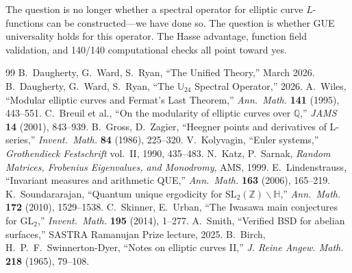 \documentclass[11pt,a4paper]{article}
\theoremstyle{plain}
\theoremstyle{definition}
\theoremstyle{remark}
\begin{document}
The question is no longer whether a spectral operator for elliptic curve $L$-functions can be constructed---we have done so. The question is whether GUE universality holds for this operator. The Hasse advantage, function field validation, and 140/140 computational checks all point toward yes.

\begin{thebibliography}{99}
 B.~Daugherty, G.~Ward, S.~Ryan, ``The Unified Theory,'' March 2026.
 B.~Daugherty, G.~Ward, S.~Ryan, ``The $\mathbb{U}_{24}$ Spectral Operator,'' 2026.
 A.~Wiles, ``Modular elliptic curves and Fermat's Last Theorem,'' \textit{Ann.~Math.} \textbf{141} (1995), 443--551.
 C.~Breuil et al., ``On the modularity of elliptic curves over $\mathbb{Q}$,'' \textit{JAMS} \textbf{14} (2001), 843--939.
 B.~Gross, D.~Zagier, ``Heegner points and derivatives of L-series,'' \textit{Invent.~Math.} \textbf{84} (1986), 225--320.
 V.~Kolyvagin, ``Euler systems,'' \textit{Grothendieck Festschrift} vol.~II, 1990, 435--483.
 N.~Katz, P.~Sarnak, \textit{Random Matrices, Frobenius Eigenvalues, and Monodromy}, AMS, 1999.
 E.~Lindenstrauss, ``Invariant measures and arithmetic QUE,'' \textit{Ann.~Math.} \textbf{163} (2006), 165--219.
 K.~Soundararajan, ``Quantum unique ergodicity for $\text{SL}_2(\mathbb{Z})\backslash\mathbb{H}$,'' \textit{Ann.~Math.} \textbf{172} (2010), 1529--1538.
 C.~Skinner, E.~Urban, ``The Iwasawa main conjectures for GL$_2$,'' \textit{Invent.~Math.} \textbf{195} (2014), 1--277.
 A.~Smith, ``Verified BSD for abelian surfaces,'' SASTRA Ramanujan Prize lecture, 2025.
 B.~Birch, H.~P.~F.~Swinnerton-Dyer, ``Notes on elliptic curves II,'' \textit{J. Reine Angew. Math.} \textbf{218} (1965), 79--108.
\end{thebibliography}
\end{document}
